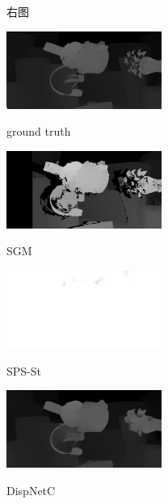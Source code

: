 \begin{figure}[htbp]
\begin{minipage}{.3\linewidth}
		\vspace{-10pt}
		\centerline{右图}
	\end{minipage}
	\hfill
	\begin{minipage}{0.3\linewidth}
		\centerline{\includegraphics[width=2in]{figures/cmp_ft3d/gt_005}}
		\vspace{-10pt}
		\centerline{ground truth}
	\end{minipage}
	\vfill
	\begin{minipage}{0.3\linewidth}
		\centerline{\includegraphics[width=2in]{figures/cmp_ft3d/sgm_005}}
		\vspace{-10pt}
		\centerline{SGM}
		\vspace{0.5in} %
	\end{minipage}
	\hfill
	\begin{minipage}{0.3\linewidth}
		\centerline{\includegraphics[width=2in]{figures/cmp_ft3d/sps_005}}
		\vspace{-10pt}
		\centerline{SPS-St}
		\vspace{0.5in} %
	\end{minipage}
	\hfill
	\begin{minipage}{0.3\linewidth}
		\centerline{\includegraphics[width=2in]{figures/cmp_ft3d/pred_005}}
		\vspace{-10pt}
		\centerline{DispNetC}
		\vspace{0.5in} %

\end{minipage}
\end{figure}
